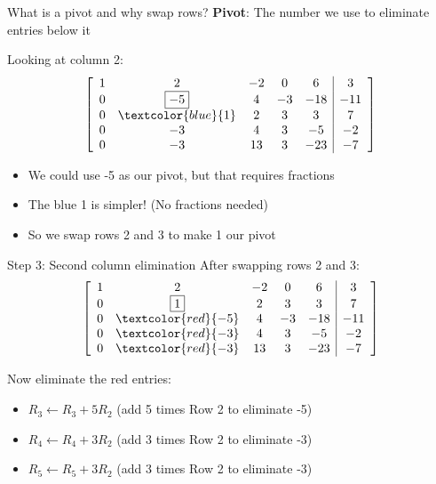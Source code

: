 \documentclass[aspectratio=169, lualatex, handout]{beamer}
\begin{document}
\begin{frame}{What is a pivot and why swap rows?}
	\textbf{Pivot}: The number we use to eliminate entries below it

	Looking at column 2:
	\[
		\left[\begin{array}{ccccc|c}
				1 & 2                   & -2 & 0  & 6   & 3   \\
				0 & \boxed{-5}          & 4  & -3 & -18 & -11 \\
				0 & \textcolor{blue}{1} & 2  & 3  & 3   & 7   \\
				0 & -3                  & 4  & 3  & -5  & -2  \\
				0 & -3                  & 13 & 3  & -23 & -7
			\end{array}\right]
	\]

	\begin{itemize}
		\item We could use -5 as our pivot, but that requires fractions
		\item The blue 1 is simpler! (No fractions needed)
		\item So we swap rows 2 and 3 to make 1 our pivot
	\end{itemize}
\end{frame}

\begin{frame}{Step 3: Second column elimination}
	After swapping rows 2 and 3:
	\[
		\left[\begin{array}{ccccc|c}
				1 & 2                   & -2 & 0  & 6   & 3   \\
				0 & \boxed{1}           & 2  & 3  & 3   & 7   \\
				0 & \textcolor{red}{-5} & 4  & -3 & -18 & -11 \\
				0 & \textcolor{red}{-3} & 4  & 3  & -5  & -2  \\
				0 & \textcolor{red}{-3} & 13 & 3  & -23 & -7
			\end{array}\right]
	\]

	Now eliminate the red entries:
	\begin{itemize}
		\item $R_3 \leftarrow R_3 + 5R_2$ (add 5 times Row 2 to eliminate -5)
		\item $R_4 \leftarrow R_4 + 3R_2$ (add 3 times Row 2 to eliminate -3)
		\item $R_5 \leftarrow R_5 + 3R_2$ (add 3 times Row 2 to eliminate -3)
	\end{itemize}
\end{frame}
\end{document}
